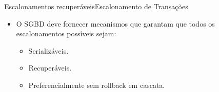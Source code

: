 \documentclass[t]{beamer}
\begin{document}

\begin{ftst}{Escalonamentos recuperáveis}{Escalonamento de Transações}
\begin{itemize}
    \item O SGBD deve fornecer mecanismos que garantam que todos os escalonamentos possíveis sejam:
    \begin{itemize}
        \item Serializáveis.
        \item Recuperáveis.
        \item Preferencialmente sem rollback em cascata.
    \end{itemize}
\end{itemize}

\end{ftst}
\end{document}
